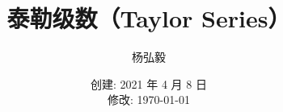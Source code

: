 \documentclass[11pt]{article}
\title{泰勒级数（Taylor Series）}
\author{杨弘毅}
\date{创建: 2021 年 4 月 8 日 \\修改: \today}
\begin{document}
\maketitle

\begin{equation*}
\end{equation*}


\begin{align*}
\end{align*}
\end{document}
